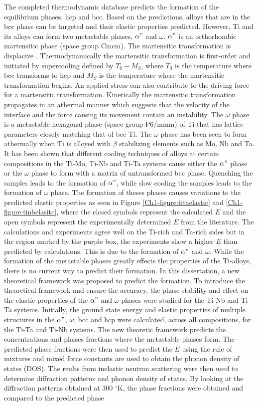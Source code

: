 The completed thermodynamic database predicts the formation of the equilibrium phases, hcp and bcc. Based on the predictions, alloys that are in the bcc phase can be targeted and their elastic properties predicted. However, Ti and its alloys can form two metastable phases, $\alpha"$ and $\omega$. $\alpha"$ is an orthorhombic martensitic phase (space group Cmcm). The martensitic transformation is displacive \cite{Khachaturyan1985,Salje1990}. Thermodynamically the martensitic transformation is first-order and initiated by supercooling defined by $T_{0}-M_{S}$, where $T_{0}$ is the temperature where bcc transforms to hcp and $M_{S}$ is the temperature where the martensitic transformation begins. An applied stress can also contribute to the driving force for a martensitic transformation. Kinetically the martensitic transformation propagates in an athermal manner which suggests that the velocity of the interface and the force causing its movement contain an instability. The $\omega$ phase is a metastable hexagonal phase (space group P6/mmm) of Ti that has lattice parameters closely matching that of bcc Ti. The $\omega$ phase has been seen to form athermally when Ti is alloyed with $\beta$ stabilizing elements such as Mo, Nb and Ta. It has been shown that different cooling techniques of alloys at certain compositions in the Ti-Mo, Ti-Nb and Ti-Ta systems cause either the $\alpha"$ phase or the $\omega$ phase to form with a matrix of untransformed bcc phase. Quenching the samples leads to the formation of $\alpha"$, while slow cooling the samples leads to the formation of $\omega$ phase. The formation of theses phases causes variations to the predicted elastic properties as seen in Figure \ref{Ch1-figure:titaelastic} and \ref{Ch1-figure:tinbelasitc}, where the closed symbols represent the calculated $E$ and the open symbols represent the experimentally determined $E$ from the literature. The calculations and experiments agree well on the Ti-rich and Ta-rich sides but in the region marked by the purple box, the experiments show a higher $E$ than predicted by calculations. This is due to the formation of $\alpha"$ and $\omega$. While the formation of the metastable phases greatly effects the properties of the Ti-alloys, there is no current way to predict their formation. In this dissertation, a new theoretical framework was proposed to predict the formation. To introduce the theoretical framework and ensure the accuracy, the phase stability and effect on the elastic properties of the $\alpha"$ and $\omega$ phases were studied for the Ti-Nb and Ti-Ta systems. Initially, the ground state energy and elastic properties of multiple structures in the $\alpha"$, $\omega$, bcc and hcp were calculated, across all compositions, for the Ti-Ta and Ti-Nb systems. The new theoretic framework predicts the concentrations and phases fractions where the metastable phases form. The predicted phase fractions were then used to predict the $E$ using the rule of mixtures and mixed force constants are used to obtain the phonon density of states (DOS). The reults from inelastic neutron scattering were then used to determine diffraction patterns and phonon density of states. By looking at the diffraction patterns obtained at 300 $^\circ$K, the phase fractions were obtained and compared to the predicted phase 